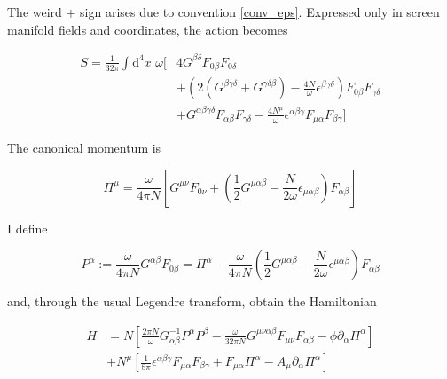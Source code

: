 \documentclass[11pt]{article}
\begin{document}
The weird $+$ sign arises due to convention \ref{conv_eps}. Expressed only in screen manifold fields and coordinates, the action becomes

\begin{equation} 
\begin{split}
	S = \frac{1}{32 \pi} \int \mathrm{d}^4 x \,\,\omega 
	[ 
	&4 G^{\beta \delta} F_{0 \beta} F_{0 \delta} \\
	&+ \left( 
	2 \left( G^{\beta \gamma \delta} + G^{ \gamma \delta \beta} \right)
	- \frac{4 N}{\omega} \epsilon^{\beta \gamma \delta}
	\right) F_{0 \beta} F_{\gamma \delta}\\
	&+ G^{\alpha \beta \gamma \delta} F_{\alpha \beta} F_{\gamma \delta}
	-  \frac{4 N^\mu}{\omega} 
	\epsilon^{\alpha \beta \gamma} F_{\mu \alpha} F_{\beta \gamma}
	]
\end{split}
\end{equation}

The canonical momentum is

\begin{equation}
	\Pi^\mu = \frac{\omega}{4 \pi N} 
	\left[ G^{\mu \nu} F_{0 \nu}
	+ \left( \frac{1}{2} G^{ \mu \alpha \beta} 
	- \frac{N}{2 \omega} \epsilon_{ \mu \alpha \beta}
	\right)
	F_{\alpha \beta}
	\right]
\end{equation}

I define 

\begin{equation}
	P^\alpha :=
	\frac{\omega}{4 \pi N} G^{\alpha \beta} F_{0 \beta}
	= \Pi^\alpha 
	- \frac{\omega}{4 \pi N} 
	\left( 
	\frac{1}{2} G^{\mu \alpha \beta} 
	- \frac{N}{2 \omega} \epsilon^{\mu \alpha \beta}
	\right)
	F_{\alpha \beta}
\end{equation}

and, through the usual Legendre transform, obtain the Hamiltonian 

\begin{equation}
	\begin{split}
		H &= N
		\left[
		\frac{2 \pi N}{\omega} G^{-1}_{\alpha \beta} P^\alpha P^\beta
		- \frac{\omega}{32 \pi N} G^{\mu \nu \alpha \beta} F_{\mu \nu} F_{\alpha \beta}
		- \phi \partial_\alpha \Pi^\alpha
		\right]\\
		&+ N^\mu
		\left[
		\frac{1}{8 \pi} \epsilon^{\alpha \beta \gamma} F_{\mu \alpha} F_{\beta \gamma} 
		+ F_{\mu \alpha} \Pi^{\alpha} - A_\mu \partial_\alpha \Pi^\alpha
		\right]
	\end{split}
\end{equation}
\end{document}
